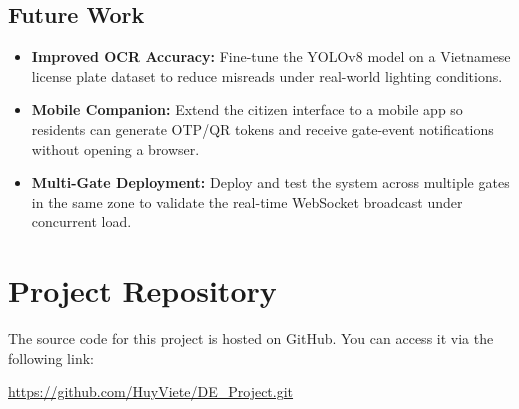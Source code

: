 \documentclass[a4paper]{article}
\begin{document}
\subsection*{Future Work}

\begin{itemize}
    \item \textbf{Improved OCR Accuracy:} Fine-tune the YOLOv8 model on a Vietnamese license plate dataset to reduce misreads under real-world lighting conditions.
    \item \textbf{Mobile Companion:} Extend the citizen interface to a mobile app so residents can generate OTP/QR tokens and receive gate-event notifications without opening a browser.
    \item \textbf{Multi-Gate Deployment:} Deploy and test the system across multiple gates in the same zone to validate the real-time WebSocket broadcast under concurrent load.
\end{itemize}

\newpage
\nocite{*}
\printbibliography[title={References}, heading=bibintoc]

\section*{Project Repository}
The source code for this project is hosted on GitHub. You can access it via the following link:

\begin{center}
    \url{https://github.com/HuyViete/DE_Project.git}
\end{center}
\end{document}
